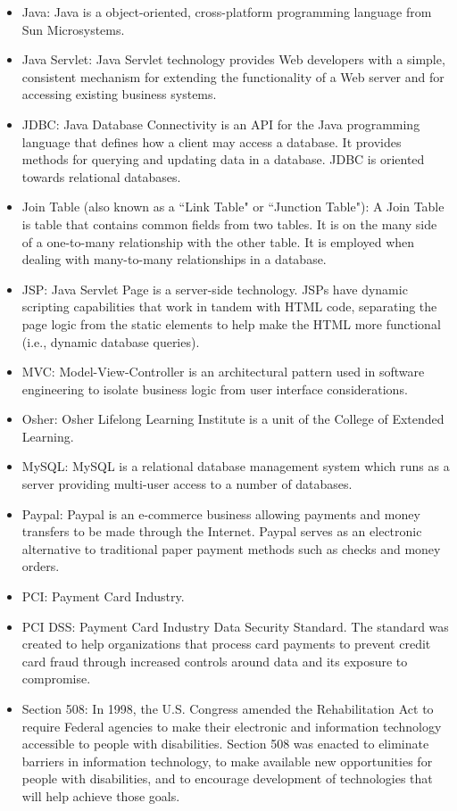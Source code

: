 \begin{itemize}
    \item Java: Java is a object-oriented, cross-platform programming language from Sun Microsystems.
    \item Java Servlet: Java Servlet technology provides Web developers with a simple, consistent mechanism for extending the functionality of a Web server and for accessing existing business systems.
    \item JDBC: Java Database Connectivity is an API for the Java programming language that defines how a client may access a database. It provides methods for querying and updating data in a database. JDBC is oriented towards relational databases.
    \item Join Table (also known as a ``Link Table" or ``Junction Table"): A Join Table is table that contains common fields from two tables. It is on the many side of a one-to-many relationship with the other table. It is employed when dealing with many-to-many relationships in a database.
    \item JSP: Java Servlet Page is a server-side technology. JSPs have dynamic scripting capabilities that work in tandem with HTML code, separating the page logic from the static elements to help make the HTML more functional (i.e., dynamic database queries).
    \item MVC\label{def:mvc}: Model-View-Controller is an architectural pattern used in software engineering to isolate business logic from user interface considerations.
    \item Osher: Osher Lifelong Learning Institute is a unit of the College of Extended Learning. 
    \item MySQL\label{mysql}: MySQL is a relational database management system which runs as a server providing multi-user access to a number of databases.
    \item Paypal\label{paypal}: Paypal is an e-commerce business allowing payments and money transfers to be made through the Internet. Paypal serves as an electronic alternative to traditional paper payment methods such as checks and money orders.
    \item PCI: Payment Card Industry.
    \item PCI DSS\label{def:PCI_DSS}: Payment Card Industry Data Security Standard. The standard was created to help organizations that process card payments to prevent credit card fraud through increased controls around data and its exposure to compromise. 
    \item Section 508: In 1998, the U.S. Congress amended the Rehabilitation Act to require Federal agencies to make their electronic and information technology accessible to people with disabilities. Section 508 was enacted to eliminate barriers in information technology, to make available new opportunities for people with disabilities, and to encourage development of technologies that will help achieve those goals.

\end{itemize}
